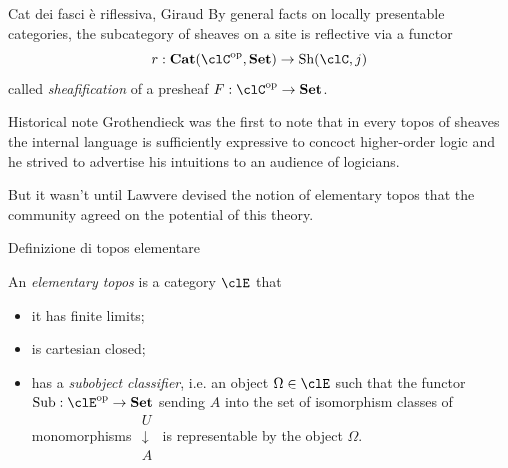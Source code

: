 \documentclass[presentation]{beamer}
\newlength{\seplen}
\newlength{\sepwid}
\def\firstblank{\,\rule{\seplen}{\sepwid}\,}
\def\Set{\mathbf{Set}}
\newcommand{\op}{\text{op}}
\begin{document}
\begin{frame}[label={sec:org5bf1529}]{Cat dei fasci è riflessiva, Giraud}
  By general facts on locally presentable categories, the subcategory of sheaves on a site is reflective via a functor
\[
r : \textbf{Cat}(\clC^\op,\Set) \to \text{Sh}(\clC,j)
\] called \emph{sheafification} of a presheaf $F : \clC^\op\to \Set$.

\begin{block}{Historical note}
  \vspace{3pt}
  \scriptsize 
Grothendieck was the first to note that in every topos of sheaves the \alert{internal language} is sufficiently expressive to concoct \alert{higher-order logic} and he strived to advertise his intuitions to an audience of logicians. 

But it wasn't until Lawvere devised the notion of \alert{elementary topos} that the community agreed on the potential of this theory.
\end{block}
\end{frame}
\begin{frame}[label={sec:org6a1b958}]{Definizione di topos elementare}
  \begin{block}{}
    An \emph{elementary topos} is a category $\clE$ that
    \begin{itemize}
    \item it has finite limits;%
    \item is cartesian closed;%
    \item has a \emph{subobject classifier}, i.e. an object $\Omega\in\clE$ such that the functor $\text{Sub} : \clE^\op\to \Set$ sending $A$ into the set of isomorphism classes of monomorphisms $\begin{smallmatrix}{U}\\\downarrow\\{A}\end{smallmatrix}$ is representable by the object $\Omega$.
    \end{itemize}
  \end{block}
  \end{frame}
\end{document}
